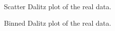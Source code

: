 \begin{multicols}{2}
    \begin{figure}[H]
    	\centering
    	\caption{Scatter Dalitz plot of the real data.} %
    	\label{fig:dalitz_real}
    \end{figure}

    \begin{figure}[H]
    	\centering
    	\caption{Binned Dalitz plot of the real data.} %
    	\label{fig:hist2d_real}
    \end{figure}
\end{multicols}

